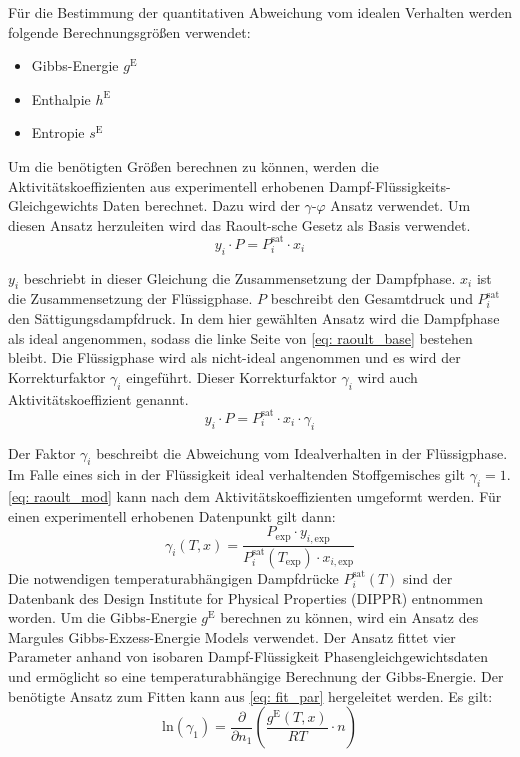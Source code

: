 \documentclass[../thesis.tex]{subfiles}
\begin{document}
Für die Bestimmung der quantitativen Abweichung vom idealen Verhalten werden folgende Berechnungsgrößen verwendet:
\begin{itemize}
	\item Gibbs-Energie $g^{\mathrm{E}}$
	\item Enthalpie $h^{\mathrm{E}}$
	\item Entropie $s^{\mathrm{E}}$
\end{itemize}

Um die benötigten Größen berechnen zu können, werden die Aktivitätskoeffizienten aus experimentell erhobenen Dampf-Flüssigkeits-Gleichgewichts Daten berechnet. Dazu wird der $\gamma$-$\varphi$ Ansatz verwendet. Um diesen Ansatz herzuleiten wird das Raoult-sche Gesetz als Basis verwendet.
\begin{equation}
	\label{eq: raoult_base}
	y_i \cdot P = P_{i}^{\mathrm{sat}} \cdot x_i
\end{equation}

$ y_i $ beschriebt in dieser Gleichung die Zusammensetzung der Dampfphase. $ x_i $ ist die Zusammensetzung der Flüssigphase. $ P $ beschreibt den Gesamtdruck und $ P_{i}^{\mathrm{sat}} $ den Sättigungsdampfdruck.
In dem hier gewählten Ansatz wird die Dampfphase als ideal angenommen, sodass die linke Seite von \autoref{eq: raoult_base} bestehen bleibt. Die Flüssigphase wird als nicht-ideal angenommen und es wird der Korrekturfaktor $\gamma_i$ eingeführt. Dieser Korrekturfaktor $\gamma_i$ wird auch Aktivitätskoeffizient genannt. 
\begin{equation}
	\label{eq: raoult_mod}
	y_i \cdot P = P_{i}^{\mathrm{sat}} \cdot x_i \cdot \gamma_i
\end{equation}

Der Faktor $\gamma_i$ beschreibt die Abweichung vom Idealverhalten in der Flüssigphase. Im Falle eines sich in der Flüssigkeit ideal verhaltenden Stoffgemisches gilt $\gamma_i = 1$. \autoref{eq: raoult_mod} kann nach dem Aktivitätskoeffizienten umgeformt werden. Für einen experimentell erhobenen Datenpunkt gilt dann:
\begin{equation}
	\gamma_i \left(T,x \right) = \dfrac{P_{\mathrm{exp}} \cdot y_{i,\mathrm{exp}}}{P_{i}^{\mathrm{sat}}(T_{\mathrm{exp}}) \cdot x_{i,\mathrm{exp}}}
\end{equation}
Die notwendigen temperaturabhängigen Dampfdrücke $P_{i}^{\mathrm{sat}}(T)$ sind der Datenbank des Design Institute for Physical Properties (DIPPR) \cite{thomson1996dippr} entnommen worden.
Um die Gibbs-Energie $g^{\mathrm{E}}$ berechnen zu können, wird ein Ansatz des Margules Gibbs-Exzess-Energie Models verwendet. Der Ansatz fittet vier Parameter anhand von isobaren Dampf-Flüssigkeit Phasengleichgewichtsdaten und ermöglicht so eine temperaturabhängige Berechnung der Gibbs-Energie. Der benötigte Ansatz zum Fitten kann aus \autoref{eq: fit_par} hergeleitet werden. Es gilt:
\begin{equation}
	\label{eq: fit_par}
	\mathrm{ln}(\gamma_1) =  \dfrac{\partial }{\partial n_1} \left( \dfrac{g^{\mathrm{E}}(T,x)}{RT} \cdot n \right)
\end{equation}
\end{document}
